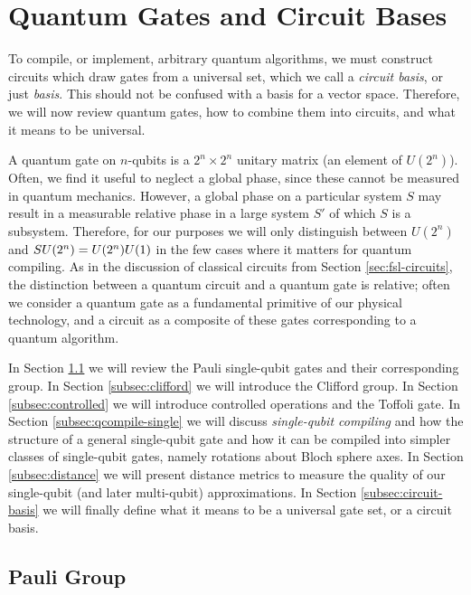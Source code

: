 \section{Quantum Gates and Circuit Bases}
\label{sec:qcompile-basis}

To compile, or implement, arbitrary quantum algorithms, we must construct circuits
which draw gates from a universal set, which we call a \emph{circuit basis},
or just \emph{basis}.
This should not be confused with a basis for a vector space.
Therefore, we will now review quantum gates, how to combine them into
circuits, and what it means to be universal.

A quantum gate on $n$-qubits is a $2^n \times 2^n$ unitary matrix
(an element of $U(2^n)$). Often, we find it useful to neglect a
global phase, since these cannot be measured in quantum mechanics.
However, a global
phase on a particular system $S$ may result in a measurable relative phase
in a large system $S'$ of which $S$ is a subsystem. Therefore, for our
purposes we will only distinguish between $U(2^n)$ and
$SU(2^n) = U(2^n) \\ U(1)$ in the few cases where it matters for
quantum compiling. As in the discussion of classical circuits from
Section \ref{sec:fsl-circuits}, the distinction between a quantum circuit
and a quantum gate is relative; often we consider a quantum gate as a
fundamental primitive of our physical technology, and a circuit as a
composite of these gates corresponding to a quantum algorithm.

In Section \ref{subsec:pauli} we
will review the Pauli single-qubit gates and their corresponding group.
In Section \ref{subsec:clifford} we will introduce the Clifford group.
In Section \ref{subsec:controlled} we will introduce controlled operations
and the Toffoli gate.
In Section \ref{subsec:qcompile-single} we will discuss \emph{single-qubit compiling}
and how the structure of a
general single-qubit gate and how it can be compiled into simpler classes
of single-qubit gates, namely rotations about Bloch sphere axes.
In Section \ref{subsec:distance} we will present distance metrics to
measure the quality of our single-qubit (and later multi-qubit) approximations.
In Section \ref{subsec:circuit-basis} we will finally
define what it means to be a universal gate set, or a circuit basis.

\subsection{Pauli Group}
\label{subsec:pauli}


